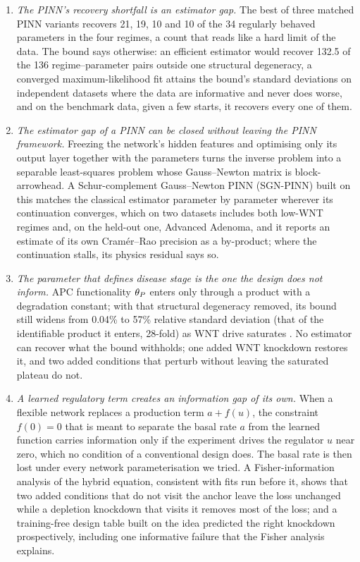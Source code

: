 \begin{enumerate}[leftmargin=1.4em,itemsep=0.3ex,topsep=0.4ex]
\item \emph{The PINN's recovery shortfall is an estimator gap.} The best of
three matched PINN variants recovers 21, 19, 10 and 10 of the 34 regularly
behaved parameters in the four regimes, a count that reads like a hard limit of
the data. The bound says otherwise: an efficient estimator would recover 132.5
of the 136 regime--parameter pairs outside one structural degeneracy, a
converged maximum-likelihood fit attains the bound's standard deviations on
independent datasets where the data are informative and never does worse, and
on the benchmark data, given a few starts, it recovers every one of them.
\item \emph{The estimator gap of a PINN can be closed without leaving the PINN
framework.} Freezing the network's hidden features and optimising only its
output layer together with the parameters turns the inverse problem into a
separable least-squares problem whose Gauss--Newton matrix is block-arrowhead.
A Schur-complement Gauss--Newton PINN (SGN-PINN) built on this matches the
classical estimator parameter by parameter wherever its continuation converges,
which on two datasets includes both low-WNT regimes and, on the held-out one,
Advanced Adenoma, and it reports an estimate of its own Cram\'er--Rao precision
as a by-product; where the continuation stalls, its physics residual says so.
\item \emph{The parameter that defines disease stage is the one the design does
not inform.} APC functionality $\theta_P$ enters only through a product with a
degradation constant; with that structural degeneracy removed, its bound still
widens from 0.04\% to 57\% relative standard deviation (that of the identifiable
product it enters, 28-fold) as WNT drive saturates \bcat{}. No estimator can recover what the bound withholds; one added WNT
knockdown restores it, and two added conditions that perturb without leaving
the saturated plateau do not.
\item \emph{A learned regulatory term creates an information gap of its own.}
When a flexible network replaces a production term $a+f(u)$, the constraint
$f(0)=0$ that is meant to separate the basal rate $a$ from the learned function
carries information only if the experiment drives the regulator $u$ near zero,
which no condition of a conventional design does. The basal rate is then lost
under every network parameterisation we tried. A Fisher-information analysis of
the hybrid equation, consistent with fits run before it, shows that two added
conditions that do not visit the anchor leave the loss unchanged while a
depletion knockdown that visits it removes most of the loss; and a
training-free design table built on the idea predicted the right knockdown
prospectively, including one informative failure that the Fisher analysis
explains.
\end{enumerate}

